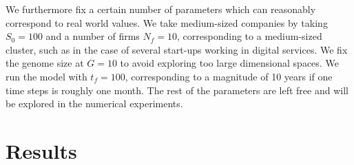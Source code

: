 \documentclass[letterpaper]{article}
\begin{document}
We furthermore fix a certain number of parameters which can reasonably correspond to real world values. We take medium-sized companies by taking $S_0 = 100$ and a number of firms $N_f = 10$, corresponding to a medium-sized cluster, such as in the case of several start-ups working in digital services. We fix the genome size at $G = 10$ to avoid exploring too large dimensional spaces. We run the model with $t_f = 100$, corresponding to a magnitude of 10 years if one time steps is roughly one month. The rest of the parameters are left free and will be explored in the numerical experiments.

\section{Results}



\begin{table}[ht!]
\caption{Saltelli sensitivity indices, for indicators at $t_f$ in rows and parameters in columns. We give for each pair the first order index (F) and the total order index (T). Non-significant values were assimilated to 0.\label{tab:gsa}}
\end{table}
\end{document}

